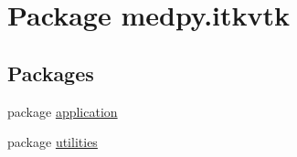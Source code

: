 \hypertarget{namespacemedpy_1_1itkvtk}{
\section{Package medpy.itkvtk}
\label{namespacemedpy_1_1itkvtk}
}
\subsection*{Packages}
\begin{DoxyCompactItemize}
\item 
package \hyperlink{namespacemedpy_1_1itkvtk_1_1application}{application}
\item 
package \hyperlink{namespacemedpy_1_1itkvtk_1_1utilities}{utilities}
\end{DoxyCompactItemize}
